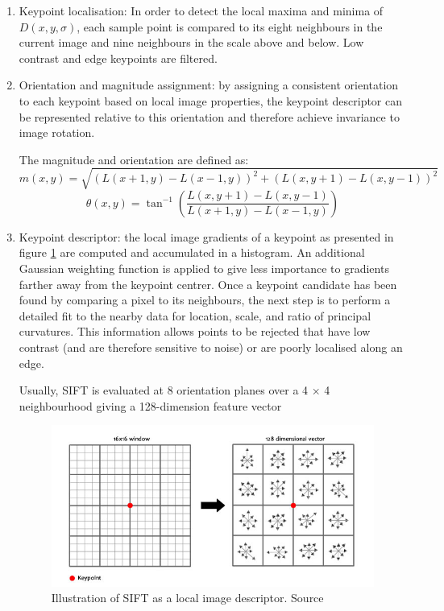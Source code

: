 \begin{enumerate}
    \item Keypoint localisation: In order to detect the local maxima and minima of $D(x, y,\sigma)$, each sample point is compared to its eight neighbours in the current image and nine neighbours in the scale above and below. Low contrast and edge keypoints are filtered.
    
    \item Orientation and magnitude assignment: by assigning a consistent orientation to each keypoint based on local image properties, the keypoint descriptor can be represented relative to this orientation and therefore achieve invariance to image rotation.
    
    The magnitude and orientation are defined as:
    $$
    m(x, y) = \sqrt{ \left( L(x +1, y) - L(x -1, y)  \right)^2 + \left( L(x, y + 1) - L(x, y - 1) \right)^2}
    $$
    $$
    \theta(x, y) =\tan^{-1} ( \frac{L(x, y + 1) - L(x, y - 1 )}{L(x + 1, y) - L(x - 1, y)} )
    $$
    
    \item Keypoint descriptor: the local image gradients of a keypoint as presented in figure \ref{fig:sift_descriptor} are computed and accumulated in a histogram. An additional Gaussian weighting function is applied to give less importance to gradients farther away from the keypoint centrer. Once a keypoint candidate has been found by comparing a pixel to its neighbours, the next step is to perform a detailed fit to the nearby data for location, scale, and ratio of principal curvatures. This information allows points to be rejected that have low contrast (and are therefore sensitive to noise) or are poorly localised along an edge.
    
    Usually, SIFT is evaluated at 8 orientation planes over a 4 × 4 neighbourhood giving a
    128-dimension feature vector
    
    \begin{figure}[h]
        \centering
        \includegraphics[scale=0.5]{img/sift_descriptor.jpg}
        \caption[Illustration of SIFT as a local image descriptor]{Illustration of SIFT as a local image descriptor. Source \cite{Lowe2004}}
        \label{fig:sift_descriptor}
    \end{figure}
\end{enumerate}

